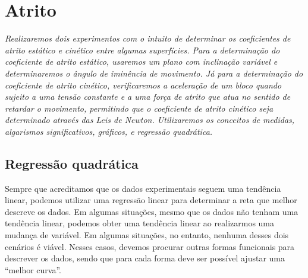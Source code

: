 \chapter{Atrito}              %
\label{Chap:ExpAtrito}        %

\begin{fullwidth}\it
	Realizaremos dois experimentos com o intuito de determinar os coeficientes de atrito estático e cinético entre algumas superfícies. Para a determinação do coeficiente de atrito estático, usaremos um plano com inclinação variável e determinaremos o ângulo de iminência de movimento. Já para a determinação do coeficiente de atrito cinético, verificaremos a aceleração de um bloco quando sujeito a uma tensão constante e a uma força de atrito que atua no sentido de retardar o movimento, permitindo que o coeficiente de atrito cinético seja determinado através das Leis de Newton. Utilizaremos os conceitos de medidas, algarismos significativos, gráficos, e regressão quadrática.
\end{fullwidth}

\section{Regressão quadrática}

Sempre que acreditamos que os dados experimentais seguem uma tendência linear, podemos utilizar uma regressão linear para determinar a reta que melhor descreve os dados. Em algumas situações, mesmo que os dados não tenham uma tendência linear, podemos obter uma tendência linear ao realizarmos uma mudança de variável. Em algumas situações, no entanto, nenhuma desses dois cenários é viável. Nesses casos, devemos procurar outras formas funcionais para descrever os dados, sendo que para cada forma deve ser possível ajustar uma ``melhor curva''.

